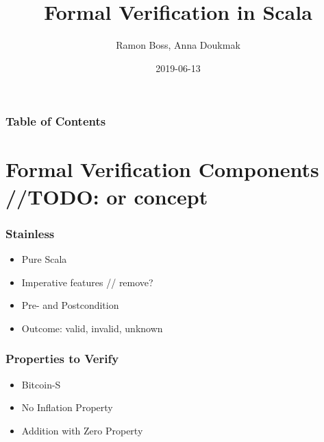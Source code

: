 \documentclass{beamer}
\begin{document}
\title{Formal Verification in Scala}
\author{Ramon Boss, Anna Doukmak}

\date{2019-06-13}

\frame{\titlepage}

\begin{frame}
  \frametitle{Table of Contents}
  \tableofcontents
\end{frame}

\section{Formal Verification Components //TODO: or concept}

\begin{frame}
\frametitle{Stainless}
  \begin{itemize}
    \item Pure Scala
    \item Imperative features // remove?
    \item Pre- and Postcondition
    \item Outcome: valid, invalid, unknown
  \end{itemize}
\end{frame}


\begin{frame}
\frametitle{Properties to Verify}
\begin{itemize}
  \item Bitcoin-S
  \item No Inflation Property
  \item Addition with Zero Property
\end{itemize}

\end{frame}
\end{document}
